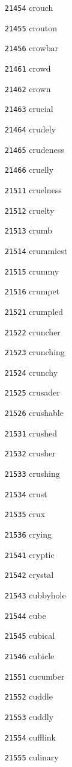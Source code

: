 \documentclass[twoside,11pt]{article}
\begin{document}
\begin{multicols}{5}
\begin{enumerate}
\item[\texttt{21454}] crouch
\item[\texttt{21455}] crouton
\item[\texttt{21456}] crowbar
\item[\texttt{21461}] crowd
\item[\texttt{21462}] crown
\item[\texttt{21463}] crucial
\item[\texttt{21464}] crudely
\item[\texttt{21465}] crudeness
\item[\texttt{21466}] cruelly
\item[\texttt{21511}] cruelness
\item[\texttt{21512}] cruelty
\item[\texttt{21513}] crumb
\item[\texttt{21514}] crummiest
\item[\texttt{21515}] crummy
\item[\texttt{21516}] crumpet
\item[\texttt{21521}] crumpled
\item[\texttt{21522}] cruncher
\item[\texttt{21523}] crunching
\item[\texttt{21524}] crunchy
\item[\texttt{21525}] crusader
\item[\texttt{21526}] crushable
\item[\texttt{21531}] crushed
\item[\texttt{21532}] crusher
\item[\texttt{21533}] crushing
\item[\texttt{21534}] crust
\item[\texttt{21535}] crux
\item[\texttt{21536}] crying
\item[\texttt{21541}] cryptic
\item[\texttt{21542}] crystal
\item[\texttt{21543}] cubbyhole
\item[\texttt{21544}] cube
\item[\texttt{21545}] cubical
\item[\texttt{21546}] cubicle
\item[\texttt{21551}] cucumber
\item[\texttt{21552}] cuddle
\item[\texttt{21553}] cuddly
\item[\texttt{21554}] cufflink
\item[\texttt{21555}] culinary

\end{enumerate}
\end{multicols}
\end{document}
